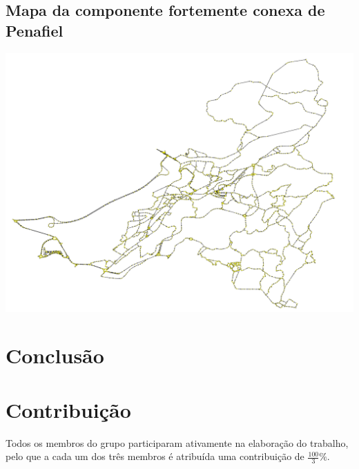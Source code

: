 \documentclass[12pt,a4paper]{report}
\begin{document}
\section{Mapa da componente fortemente conexa de Penafiel}
\includegraphics[width=1.0\textwidth]{./imgs/scc/penafielStrongSCC.png}



\chapter{Conclusão}



\chapter{Contribuição}
Todos os membros do grupo participaram ativamente na elaboração do trabalho, pelo que a cada um dos três membros é atribuída uma contribuição de \( \frac{100}{3} \% \).
\end{document}
